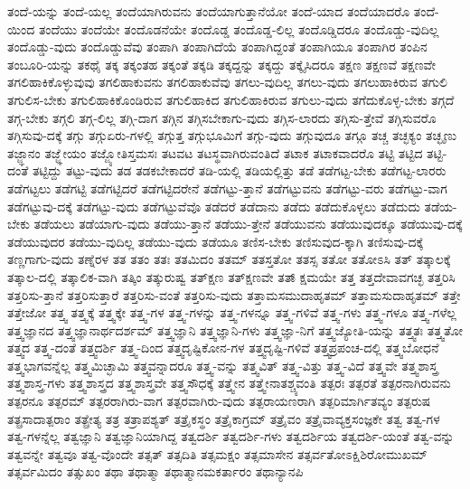 {ತಂದೆ-ಯನ್ನು
ತಂದೆ-ಯಲ್ಲ
ತಂದೆಯಾಗಿರುವನು
ತಂದೆಯಾಗುತ್ತಾನೆಯೋ
ತಂದೆ-ಯಾದ
ತಂದೆಯಾದರೊ
ತಂದೆ-ಯಿಂದ
ತಂದೆಯು
ತಂದೆಯೇ
ತಂದೊಡನೆಯೇ
ತಂದೊಡ್ಡ
ತಂದೊಡ್ಡ-ಲಿಲ್ಲ
ತಂದೊಡ್ಡಿದರೂ
ತಂದೊಡ್ಡು-ವುದಿಲ್ಲ
ತಂದೊಡ್ಡು-ವುದು
ತಂದೊಡ್ಡುವೆವು
ತಂಪಾಗಿ
ತಂಪಾಗಿದೆಯೆ
ತಂಪಾಗಿದ್ದಂತೆ
ತಂಪಾಗಿಯೂ
ತಂಪಾಗಿರ
ತಂಪಿನ
ತಂಬೂರಿ-ಯನ್ನು
ತಕಥೈ
ತಕ್ಕ
ತಕ್ಕಂತಹ
ತಕ್ಕಂತೆ
ತಕ್ಕಡಿ
ತಕ್ಕದ್ದನ್ನು
ತಕ್ಕದ್ದು
ತಕ್ಕೈಸಿದರೂ
ತಕ್ಷಣ
ತಕ್ಷಣವೆ
ತಕ್ಷಣವೇ
ತಗಲಿಹಾಕಿಕೊಳ್ಳುವುವು
ತಗಲಿಹಾಕುವನು
ತಗಲಿಹಾಕುವೆವು
ತಗಲು-ವುದಿಲ್ಲ
ತಗಲು-ವುದು
ತಗಲುಹಾಕಿರುವ
ತಗುಲಿ
ತಗುಲಿಸ-ಬೇಕು
ತಗುಲಿಹಾಕಿಕೊಂಡಿರುವ
ತಗುಲಿಹಾಕಿದ
ತಗುಲಿಹಾಕಿರುವ
ತಗುಲು-ವುದು
ತಗೆದುಕೊಳ್ಳ-ಬೇಕು
ತಗ್ಗದೆ
ತಗ್ಗ-ಬೇಕು
ತಗ್ಗಲಿ
ತಗ್ಗ-ಲಿಲ್ಲ
ತಗ್ಗಿ-ದಾಗ
ತಗ್ಗಿನ
ತಗ್ಗಿಸಬೇಕಾಗು-ವುದು
ತಗ್ಗಿಸ-ಲಾರದು
ತಗ್ಗಿಸು-ತ್ತೇವೆ
ತಗ್ಗಿಸುವರೊ
ತಗ್ಗಿಸುವು-ದಕ್ಕೆ
ತಗ್ಗು
ತಗ್ಗುಏರು-ಗಳಲ್ಲಿ
ತಗ್ಗುತ್ತ
ತಗ್ಗುಭೂಮಿಗೆ
ತಗ್ಗು-ವುದು
ತಗ್ಗುವುದೂ
ತಗ್ಗೂ
ತಚ್ಚ
ತಚ್ಛಕ್ಯಂ
ತಚ್ಛೃಣು
ತಜ್ಜ್ಞಾನಂ
ತಜ್ಜ್ಞೇಯಂ
ತಜ್ಜ್ಯೋತಿಸ್ತಮಸಃ
ತಟವಟ
ತಟಸ್ಥವಾಗಿರುವಂತಿದೆ
ತಟಾಕ
ತಟಾಕವಾದರೊ
ತಟ್ಟಿ
ತಟ್ಟಿದ
ತಟ್ಟಿ-ದಂತೆ
ತಟ್ಟಿದ್ದು
ತಟ್ಟು-ವುದು
ತಡ
ತಡಕಬೇಕಾದರೆ
ತಡಿ-ಯಲ್ಲಿ
ತಡಿಯಲ್ಲಿತ್ತು
ತಡೆ
ತಡೆಗಟ್ಟ-ಬೇಕು
ತಡೆಗಟ್ಟ-ಲಾರರು
ತಡೆಗಟ್ಟಲು
ತಡೆಗಟ್ಟಿ
ತಡೆಗಟ್ಟಿದರೆ
ತಡೆಗಟ್ಟಿದರೇನೆ
ತಡೆಗಟ್ಟು-ತ್ತಾನೆ
ತಡೆಗಟ್ಟುವನು
ತಡೆಗಟ್ಟು-ವರು
ತಡೆಗಟ್ಟು-ವಾಗ
ತಡೆಗಟ್ಟುವು-ದಕ್ಕೆ
ತಡೆಗಟ್ಟು-ವುದು
ತಡೆಗಟ್ಟುವೆವೊ
ತಡೆದರೆ
ತಡೆದಾನು
ತಡೆದು
ತಡೆದುಕೊಳ್ಳಲು
ತಡೆದುದು
ತಡೆಯ-ಬೇಕು
ತಡೆಯಲು
ತಡೆಯಾಗು-ವುದು
ತಡೆಯು-ತ್ತಾನೆ
ತಡೆಯು-ತ್ತೇನೆ
ತಡೆಯುವನು
ತಡೆಯುವುದಕ್ಕೂ
ತಡೆಯುವು-ದಕ್ಕೆ
ತಡೆಯುವುದರ
ತಡೆಯು-ವುದಿಲ್ಲ
ತಡೆಯು-ವುದು
ತಡೆಯೂ
ತಣಿಸ-ಬೇಕು
ತಣಿಸುವುದ-ಕ್ಕಾಗಿ
ತಣಿಸುವು-ದಕ್ಕೆ
ತಣ್ಣಗಾಗು-ವುದು
ತಣ್ನೆರಳ
ತತ
ತತಂ
ತತಃ
ತತಮಿದಂ
ತತಮ್
ತತಸ್ತತೋ
ತತಸ್ಸ
ತತೋ
ತತೋಽಸಿ
ತತ್
ತತ್ಕಾಲಕ್ಕೆ
ತತ್ಕಾಲ-ದಲ್ಲಿ
ತತ್ಕಾಲಿಕ-ವಾಗಿ
ತತ್ಕಿಂ
ತತ್ಕುರುಷ್ವ
ತತ್ಕ್ಷಣ
ತತ್ಕ್ಷಣವೇ
ತತ್ಕ್ಷಾಮಯೇ
ತತ್ತ
ತತ್ತದೇವಾವಗಚ್ಛ
ತತ್ತರಿಸಿ
ತತ್ತರಿಸು-ತ್ತಾನೆ
ತತ್ತರಿಸುತ್ತಾರೆ
ತತ್ತರಿಸು-ವಂತೆ
ತತ್ತರಿಸು-ವುದು
ತತ್ತಾಮಸಮುದಾಹೃತಮ್
ತತ್ತಾಮಸುದಾಹೃತಮ್
ತತ್ತೇ
ತತ್ತೇಜೋ
ತತ್ತ್ವ
ತತ್ತ್ವಕ್ಕೆ
ತತ್ತ್ವಕ್ಕೇ
ತತ್ತ್ವ-ಗಳ
ತತ್ತ್ವ-ಗಳನ್ನು
ತತ್ತ್ವ-ಗಳನ್ನೂ
ತತ್ತ್ವ-ಗಳಿವೆ
ತತ್ತ್ವ-ಗಳು
ತತ್ತ್ವ-ಗಳೂ
ತತ್ತ್ವ-ಗಳೆಲ್ಲ
ತತ್ತ್ವಜ್ಞಾನದ
ತತ್ತ್ವಜ್ಞಾನಾರ್ಥದರ್ಶಮ್
ತತ್ತ್ವಜ್ಞಾನಿ
ತತ್ತ್ವಜ್ಞಾನಿ-ಗಳು
ತತ್ತ್ವಜ್ಞಾ-ನಿಗೆ
ತತ್ತ್ವಜ್ಯೋತಿ-ಯನ್ನು
ತತ್ತ್ವತಃ
ತತ್ತ್ವತೋ
ತತ್ತ್ವದ
ತತ್ತ್ವ-ದಂತೆ
ತತ್ತ್ವದರ್ಶಿ
ತತ್ತ್ವ-ದಿಂದ
ತತ್ತ್ವದೃಷ್ಟಿಕೋನ-ಗಳ
ತತ್ತ್ವದೃಷ್ಟಿ-ಗಳಿವೆ
ತತ್ತ್ವಪ್ರಪಂಚ-ದಲ್ಲಿ
ತತ್ತ್ವಬೋಧನೆ
ತತ್ತ್ವಭಾಗವನ್ನೆಲ್ಲ
ತತ್ತ್ವಮಿಚ್ಛಾಮಿ
ತತ್ತ್ವವನ್ನಾದರೂ
ತತ್ತ್ವ-ವನ್ನು
ತತ್ತ್ವವಿತ್
ತತ್ತ್ವ-ವಿತ್ತು
ತತ್ತ್ವ-ವಿದೆ
ತತ್ತ್ವವೇ
ತತ್ತ್ವಶಾಸ್ತ್ರ
ತತ್ತ್ವಶಾಸ್ತ್ರ-ಗಳು
ತತ್ತ್ವಶಾಸ್ತ್ರದ
ತತ್ತ್ವಶಾಸ್ತ್ರವೇ
ತತ್ತ್ವಸೌಧಕ್ಕೆ
ತತ್ತ್ವೇನ
ತತ್ತ್ವೇನಾತಶ್ಚ್ಯವಂತಿ
ತತ್ಪರಃ
ತತ್ಪರತೆ
ತತ್ಪರನಾಗಿರುವನು
ತತ್ಪರನೂ
ತತ್ಪರಮ್
ತತ್ಪರರಾಗಿರು-ವಾಗ
ತತ್ಪರವಾಗಿರು-ವುದು
ತತ್ಪರಾಯಣರಾಗಿ
ತತ್ಪರಿಮಾರ್ಗಿತವ್ಯಂ
ತತ್ಪರುಷ
ತತ್ಪ್ರಸಾದಾತ್ಪರಾಂ
ತತ್ಪ್ರೇತ್ಯ
ತತ್ರ
ತತ್ರಾಪಶ್ಯತ್
ತತ್ರೈಕಸ್ಥಂ
ತತ್ರೈಕಾಗ್ರಮ್
ತತ್ರೈವಂ
ತತ್ರೈವಾವ್ಯಕ್ತಸಂಜ್ಞಕೇ
ತತ್ವ
ತತ್ವ-ಗಳ
ತತ್ವ-ಗಳನ್ನೆಲ್ಲ
ತತ್ವಜ್ಞಾನಿ
ತತ್ವಜ್ಞಾನಿಯಾಗಿದ್ದ
ತತ್ವದರ್ಶಿ
ತತ್ವದರ್ಶಿ-ಗಳು
ತತ್ವದರ್ಶಿಯ
ತತ್ವದರ್ಶಿ-ಯಂತೆ
ತತ್ವ-ವನ್ನು
ತತ್ವವನ್ನೇ
ತತ್ವವೂ
ತತ್ವ-ವೊಂದೇ
ತತ್ಸತ್
ತತ್ಸದಿತಿ
ತತ್ಸಮಕ್ಷಂ
ತತ್ಸಮಾಸೇನ
ತತ್ಸರ್ವತೋಽಕ್ಷಿಶಿರೋಮುಖಮ್
ತತ್ಸರ್ವಮಿದಂ
ತತ್ಸುಖಂ
ತಥಾ
ತಥಾತ್ಮಾ
ತಥಾತ್ಮಾನಮಕರ್ತಾರಂ
ತಥಾನ್ಯಾನಪಿ
}
